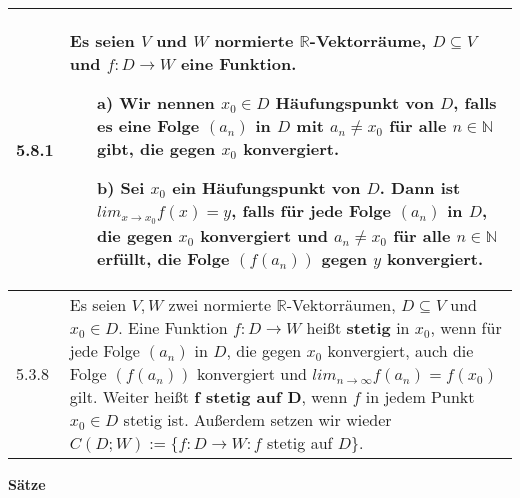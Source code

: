     \begin{longtable}{p{1cm} p{16cm}}
        \toprule

        5.8.1 & Es seien $V$ und $W$ normierte $\mathbb{R}$-Vektorräume, $D \subseteq V$ und $f: D \rightarrow W$ eine Funktion.
                \begin{itemize}[topsep=-0.5cm]
                    \item[a)] Wir nennen $x_0 \in D$ \textbf{Häufungspunkt} von $D$, falls es eine Folge $(a_n)$ in $D$ mit 
                                $a_n \neq x_0$ für alle $n \in \mathbb{N}$ gibt, die gegen $x_0$ konvergiert.
                    \item[b)] Sei $x_0$ ein Häufungspunkt von $D$. Dann ist $lim_{x \rightarrow x_0} f(x) = y$, falls für jede 
                                Folge $(a_n)$ in $D$, die gegen $x_0$ konvergiert und $a_n \neq x_0$ für alle $n \in \mathbb{N}$
                                erfüllt, die Folge $(f(a_n))$ gegen $y$ konvergiert.
                \end{itemize} \vspace{-0cm} \\
        \midrule
        5.3.8 & Es seien $V,W$ zwei normierte $\mathbb{R}$-Vektorräumen, $D \subseteq V$ und $x_0 \in D$. Eine Funktion $f: D\rightarrow W$
                heißt \textbf{stetig} in $x_0$, wenn für jede Folge $(a_n)$ in $D$, die gegen $x_0$ konvergiert, auch die Folge
                $(f(a_n))$ konvergiert und $lim_{n \rightarrow \infty} f(a_n) = f(x_0)$ gilt. \hfill \break
                Weiter heißt \textbf{f stetig auf D}, wenn $f$ in jedem Punkt $x_0 \in D$ stetig ist. \hfill \break
                Au\ss erdem setzen wir wieder $C(D;W) := \{f: D\rightarrow W: f$ stetig auf $D$\}. \\

        \bottomrule

    \end{longtable}
    

    

    \noindent 
    \textbf{Sätze}
    
